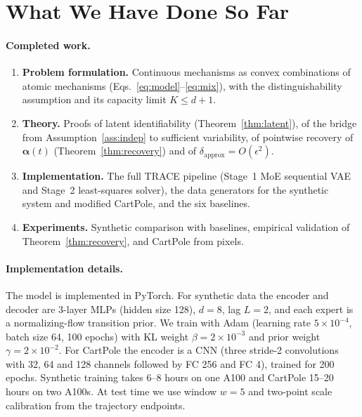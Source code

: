 \documentclass[sigconf,nonacm]{acmart}
\theoremstyle{plain}
\theoremstyle{definition}
\newcommand{\va}{\boldsymbol{\alpha}}
\newcommand{\dapx}{\delta_{\mathrm{approx}}}
\begin{document}
\section{What We Have Done So Far}

\paragraph{Completed work.}
\begin{enumerate}
\item \textbf{Problem formulation.} Continuous mechanisms as convex combinations of atomic mechanisms (Eqs.~\ref{eq:model}--\ref{eq:mix}), with the distinguishability assumption and its capacity limit $K\le d+1$.
\item \textbf{Theory.} Proofs of latent identifiability (Theorem~\ref{thm:latent}), of the bridge from Assumption~\ref{ass:indep} to sufficient variability, of pointwise recovery of $\va(t)$ (Theorem~\ref{thm:recovery}) and of $\dapx=O(\epsilon^2)$.
\item \textbf{Implementation.} The full TRACE pipeline (Stage~1 MoE sequential VAE and Stage~2 least-squares solver), the data generators for the synthetic system and modified CartPole, and the six baselines.
\item \textbf{Experiments.} Synthetic comparison with baselines, empirical validation of Theorem~\ref{thm:recovery}, and CartPole from pixels.
\end{enumerate}

\paragraph{Implementation details.}
The model is implemented in PyTorch. For synthetic data the encoder and decoder are 3-layer MLPs (hidden size 128), $d=8$, lag $L=2$, and each expert is a normalizing-flow transition prior. We train with Adam (learning rate $5\times10^{-4}$, batch size 64, 100 epochs) with KL weight $\beta=2\times10^{-3}$ and prior weight $\gamma=2\times10^{-2}$. For CartPole the encoder is a CNN (three stride-2 convolutions with 32, 64 and 128 channels followed by FC 256 and FC 4), trained for 200 epochs. Synthetic training takes 6--8 hours on one A100 and CartPole 15--20 hours on two A100s. At test time we use window $w=5$ and two-point scale calibration from the trajectory endpoints.
\end{document}
